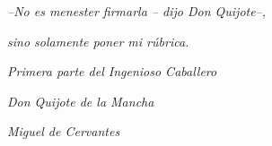 \hfill \emph{--No es menester firmarla -- dijo Don Quijote--,}

\hfill \emph{sino solamente poner mi rúbrica.}

\hfill 

\hfill \emph{Primera parte del Ingenioso Caballero} 

\hfill \emph{Don Quijote de la Mancha}

\hfill \emph{Miguel de Cervantes}


\newpage
\thispagestyle{empty}\mbox{}

\newpage


